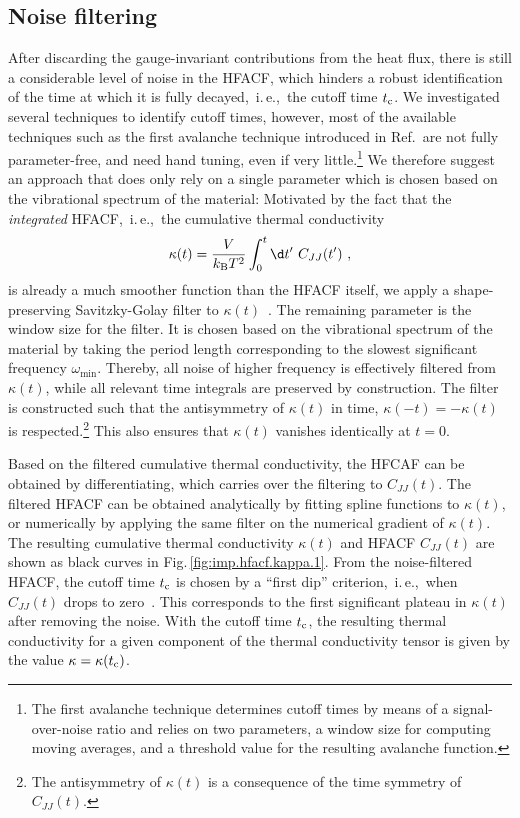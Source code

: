\subsection{Noise filtering}
After discarding the gauge-invariant contributions from the heat flux, there is still a considerable level of noise in the HFACF, which hinders a robust identification of the time at which it is fully decayed,~i.\,e.,~the cutoff time $t_{\rm c}$. We investigated several techniques to identify cutoff times, however, most of the available techniques such as the first avalanche technique introduced in Ref.\,\cite{Chen2010} are not fully parameter-free, and need hand tuning, even if very little.\footnote{The first avalanche technique determines cutoff times by means of a signal-over-noise ratio and relies on two parameters, a window size for computing moving averages, and a threshold value for the resulting avalanche function.} We therefore suggest an approach that does only rely on a single parameter which is chosen based on the vibrational spectrum of the material: Motivated by the fact that the \emph{integrated} HFACF,~i.\,e.,~the cumulative thermal conductivity
\begin{align}
	\kappa (t)
		=
		\frac{V}{k_{\rm B} T^2} 
		\int_{0}^{t} 
		\d t' ~ C_{JJ} (t')~,
	\label{eq:imp.kappa.cum}
\end{align}
is already a much smoother function than the HFACF itself, we apply a shape-preserving Savitzky-Golay filter to $\kappa (t)$~\cite{Savitzky1964}. The remaining parameter is the window size for the filter. It is chosen based on the vibrational spectrum of the material by taking the period length corresponding to the slowest significant frequency $\omega_{\min}$. Thereby, all noise of higher frequency is effectively filtered from $\kappa (t)$, while all relevant time integrals are preserved by construction. The filter is constructed such that the antisymmetry of $\kappa (t)$ in time, $\kappa (-t) = - \kappa (t)$ is respected.\footnote{The antisymmetry of $\kappa (t)$ is a consequence of the time symmetry of $C_{JJ} (t)$.} This also ensures that $\kappa (t)$ vanishes identically at $t=0$.

Based on the filtered cumulative thermal conductivity, the HFCAF can be obtained by differentiating, which carries over the filtering to $C_{JJ} (t)$. The filtered HFACF can be obtained analytically by fitting spline functions to $\kappa (t)$, or numerically by applying the same filter on the numerical gradient of $\kappa (t)$. The resulting cumulative thermal conductivity $\kappa (t)$ and HFACF $C_{JJ} (t)$ are shown as black curves in Fig.\,\ref{fig:imp.hfacf.kappa.1}. From the noise-filtered HFACF, the cutoff time $t_{\rm c}$ is chosen by a ``first dip'' criterion,~i.\,e.,~when $C_{JJ} (t)$ drops to zero~. This corresponds to the first significant plateau in $\kappa (t)$ after removing the noise. With the cutoff time $t_{\rm c}$, the resulting thermal conductivity for a given component of the thermal conductivity tensor is given by the value $\kappa = \kappa (t_{\rm c})$.

